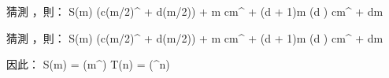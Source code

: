 猜測 ，則：
\startformula\startmathalignment[n=3]
\NC S(m) \NC {}\Big(c(m/2)^{} + d(m/2)\Big) + m \NC \NR
\NC      \NC \le cm^{} + (d + 1)m       \NC (d ) \NR
\NC      \NC \le cm^{} + dm \NC \NR
\stopmathalignment\stopformula

猜測 ，則：
\startformula\startmathalignment[n=3]
\NC S(m) \NC {}\Big(c(m/2)^{} + d(m/2)\Big) + m \NC \NR
\NC      \NC \ge cm^{} + (d + 1)m       \NC (d ) \NR
\NC      \NC \ge cm^{} + dm \NC \NR
\stopmathalignment\stopformula

因此：
\startformula\startmathalignment
\NC S(m) \NC = \Theta(m^{}) \NR
\NC T(n) \NC = \Theta(\lg^{}{n}) \NR
\stopmathalignment\stopformula
\stopANSWER

\stopsection
